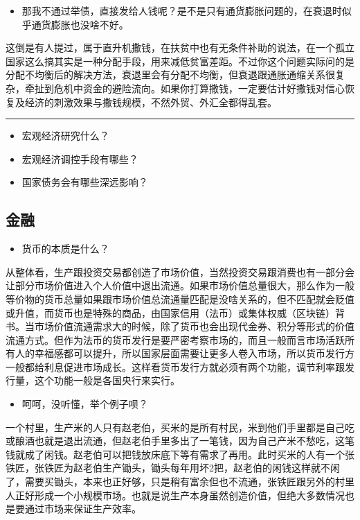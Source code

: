 \documentclass[
  letterpaper,
  DIV=11,
  numbers=noendperiod]{scrreprt}
\providecommand{\tightlist}{%
  \setlength{\itemsep}{0pt}\setlength{\parskip}{0pt}}\usepackage{longtable,booktabs,array}
\begin{document}
\begin{itemize}
\tightlist
\item
  那我不通过举债，直接发给人钱呢？是不是只有通货膨胀问题的，在衰退时似乎通货膨胀也没啥不好。
\end{itemize}

这倒是有人提过，属于直升机撒钱，在扶贫中也有无条件补助的说法，在一个孤立国家这么搞其实是一种分配手段，用来减低贫富差距。不过你这个问题实际问的是分配不均衡后的解决方法，衰退里会有分配不均衡，但衰退跟通胀通缩关系很复杂，牵扯到危机中资金的避险流向。如果你打算撒钱，一定要估计好撒钱对信心恢复及经济的刺激效果与撒钱规模，不然外贸、外汇全都得乱套。

\begin{center}\rule{0.5\linewidth}{0.5pt}\end{center}

\begin{itemize}
\tightlist
\item
  宏观经济研究什么？
\item
  宏观经济调控手段有哪些？
\item
  国家债务会有哪些深远影响？
\end{itemize}

\subsection{金融}\label{ux91d1ux878d}

\begin{itemize}
\tightlist
\item
  货币的本质是什么？
\end{itemize}

从整体看，生产跟投资交易都创造了市场价值，当然投资交易跟消费也有一部分会让部分市场价值进入个人价值中退出流通。如果市场价值总量很大，那么作为一般等价物的货币总量如果跟市场价值总流通量匹配是没啥关系的，但不匹配就会贬值或升值，而货币也是特殊的商品，由国家信用（法币）或集体权威（区块链）背书。当市场价值流通需求大的时候，除了货币也会出现代金券、积分等形式的价值流通方式。但作为法币的货币发行是要严密考察市场的，而且一般而言市场活跃所有人的幸福感都可以提升，所以国家层面需要让更多人卷入市场，所以货币发行方一般都给利息促进市场成长。这样看货币发行方就必须有两个功能，调节利率跟发行量，这个功能一般是各国央行来实行。

\begin{itemize}
\tightlist
\item
  呵呵，没听懂，举个例子呗？
\end{itemize}

一个村里，生产米的人只有赵老伯，买米的是所有村民，米到他们手里都是自己吃或酿酒也就是退出流通，但赵老伯手里多出了一笔钱，因为自己产米不愁吃，这笔钱就成了闲钱。赵老伯可以把钱放床底下等有需求了再用。此时买米的人有一个张铁匠，张铁匠为赵老伯生产锄头，锄头每年用坏2把，赵老伯的闲钱这样就不闲了，需要买锄头，本来也正好够，只是稍有富余但也不流通，张铁匠跟另外的村里人正好形成一个小规模市场。也就是说生产本身虽然创造价值，但绝大多数情况也是要通过市场来保证生产效率。
\end{document}

